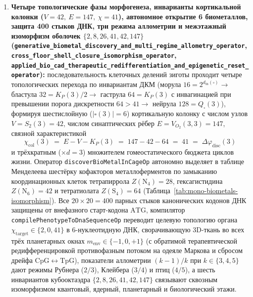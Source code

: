 \begin{theorem}
\begin{enumerate}[label=\textbf{\arabic*.},noitemsep]
\item \textbf{Четыре топологические фазы морфогенеза, инварианты кортикальной колонки ($V = 42,\ E = 147,\ \chi = 41$), автономное открытие 6 биометаллов, защита 400 стыков ДНК, три режима аллометрии и межэтажный изоморфизм оболочек $\{2, 8, 26, 41, 42, 147\}$ (\texttt{generative\_\allowbreak biometal\_\allowbreak discovery\_\allowbreak and\_\allowbreak multi\_\allowbreak regime\_\allowbreak allometry\_\allowbreak operator}, \texttt{cross\_\allowbreak floor\_\allowbreak shell\_\allowbreak closure\_\allowbreak isomorphism\_\allowbreak operator}, \texttt{applied\_\allowbreak bio\_\allowbreak cad\_\allowbreak therapeutic\_\allowbreak redifferentiation\_\allowbreak and\_\allowbreak epigenetic\_\allowbreak reset\_\allowbreak operator}):}
  последовательность клеточных делений зиготы проходит четыре топологических перехода по инвариантам ДКМ (морула $16 = 2^{d_{\mathrm{in}}(\square)} \to$ бластула $32 = K_P(3)/2 \to$ гаструла $64 = K_P(3)$ с инвагинацией при превышении порога дискретности $64 > 41 \to$ нейрула $128 = Q_\square(3)$), формируя шестислойную ($|\square(3)| = 6$) кортикальную колонку с числом узлов $V = S_2(3) = 42$, числом синаптических рёбер $E = V_{O_2}(3,3) = 147$, связной характеристикой
  \begin{equation}
    \label{eq:mono-cortical-column-chi}
    \chi_{\mathrm{col}}(3) \;=\; E - V - K_P(3) \;=\; 147 - 42 - 64 \;=\; 41 \;=\; \Delta\varphi_{\mathrm{disc}}(3)
  \end{equation}
  и трёхкратным ($\times d = 3$) множителем гомеостатического бюджета циклов жизни. Оператор \texttt{discoverBioMetalInCageOp} автономно выделяет в таблице Менделеева шестёрку кофакторов металлоферментов по замыканию координационных клеток тетрапиррола $Z(\mathrm{N_4}) = 28$, гексагистидина $Z(\mathrm{N_6}) = 42$ и тетратиолата $Z(\mathrm{S_4}) = 64$ (Таблица~\ref{tab:mono-biometals-isomorphism}). Все $20\times 20 = 400$ парных стыков канонических кодонов ДНК защищены от внефазного старт-кодона $\mathrm{ATG}$, компилятор \texttt{compilePhenotypeToDnaSequenceOp} переводит целевую топологию органа $\chi_{\mathrm{target}} \in \{2, 0, 41\}$ в 6-нуклеотидную ДНК, сворачивающую 3D-ткань во всех трёх планетарных окнах $m_{\mathrm{env}} \in \{-1, 0, +1\}$ (с обратимой терапевтической редифференцировкой противофазным потоком на одеяле Маркова и сбросом дрейфа $\mathrm{CpG} \leftrightarrow \mathrm{TpG}$), показатели аллометрии $(k-1)/k$ при $k \in \{3, 4, 5\}$ дают режимы Рубнера ($2/3$), Клейбера ($3/4$) и птиц ($4/5$), а шесть инвариантов кубооктаэдра $\{2, 8, 26, 41, 42, 147\}$ связывают сквозным изоморфизмом квантовый, ядерный, планетарный и биологический этажи.
\end{enumerate}
\end{theorem}

